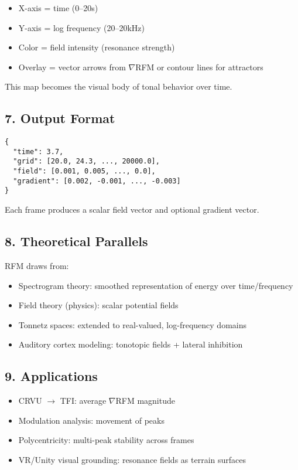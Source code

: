 \begin{itemize}
    \item X-axis = time (0–20s)
    \item Y-axis = log frequency (20–20kHz)
    \item Color = field intensity (resonance strength)
    \item Overlay = vector arrows from $\nabla$RFM or contour lines for attractors
\end{itemize}

This map becomes the visual body of tonal behavior over time.

\subsection*{7. Output Format}

\begin{verbatim}
{
  "time": 3.7,
  "grid": [20.0, 24.3, ..., 20000.0],
  "field": [0.001, 0.005, ..., 0.0],
  "gradient": [0.002, -0.001, ..., -0.003]
}
\end{verbatim}

Each frame produces a scalar field vector and optional gradient vector.

\subsection*{8. Theoretical Parallels}

RFM draws from:

\begin{itemize}
    \item Spectrogram theory: smoothed representation of energy over time/frequency
    \item Field theory (physics): scalar potential fields
    \item Tonnetz spaces: extended to real-valued, log-frequency domains
    \item Auditory cortex modeling: tonotopic fields + lateral inhibition
\end{itemize}

\subsection*{9. Applications}

\begin{itemize}
    \item CRVU $\rightarrow$ TFI: average $\nabla$RFM magnitude
    \item Modulation analysis: movement of peaks
    \item Polycentricity: multi-peak stability across frames
    \item VR/Unity visual grounding: resonance fields as terrain surfaces
\end{itemize}

